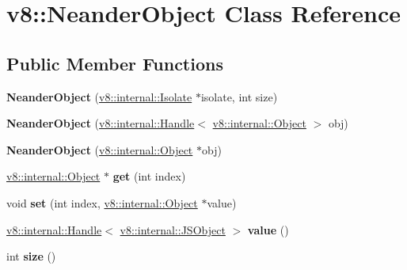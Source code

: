 \hypertarget{classv8_1_1_neander_object}{}\section{v8\+:\+:Neander\+Object Class Reference}
\label{classv8_1_1_neander_object}
\subsection*{Public Member Functions}
\begin{DoxyCompactItemize}
\item 
{\bfseries Neander\+Object} (\hyperlink{classv8_1_1internal_1_1_isolate}{v8\+::internal\+::\+Isolate} $\ast$isolate, int size)\hypertarget{classv8_1_1_neander_object_ab43be492a88b997dc95e2172069aaeeb}{}\label{classv8_1_1_neander_object_ab43be492a88b997dc95e2172069aaeeb}

\item 
{\bfseries Neander\+Object} (\hyperlink{classv8_1_1internal_1_1_handle}{v8\+::internal\+::\+Handle}$<$ \hyperlink{classv8_1_1internal_1_1_object}{v8\+::internal\+::\+Object} $>$ obj)\hypertarget{classv8_1_1_neander_object_afb3c7c82a9f93d281468ce7395d7274c}{}\label{classv8_1_1_neander_object_afb3c7c82a9f93d281468ce7395d7274c}

\item 
{\bfseries Neander\+Object} (\hyperlink{classv8_1_1internal_1_1_object}{v8\+::internal\+::\+Object} $\ast$obj)\hypertarget{classv8_1_1_neander_object_a93f0c214769d2c36648aa4d1c05394bb}{}\label{classv8_1_1_neander_object_a93f0c214769d2c36648aa4d1c05394bb}

\item 
\hyperlink{classv8_1_1internal_1_1_object}{v8\+::internal\+::\+Object} $\ast$ {\bfseries get} (int index)\hypertarget{classv8_1_1_neander_object_a53140b096e48598b3c6b57ead088fc2b}{}\label{classv8_1_1_neander_object_a53140b096e48598b3c6b57ead088fc2b}

\item 
void {\bfseries set} (int index, \hyperlink{classv8_1_1internal_1_1_object}{v8\+::internal\+::\+Object} $\ast$value)\hypertarget{classv8_1_1_neander_object_adc01a7a561fcd3becf63a02c8c639baa}{}\label{classv8_1_1_neander_object_adc01a7a561fcd3becf63a02c8c639baa}

\item 
\hyperlink{classv8_1_1internal_1_1_handle}{v8\+::internal\+::\+Handle}$<$ \hyperlink{classv8_1_1internal_1_1_j_s_object}{v8\+::internal\+::\+J\+S\+Object} $>$ {\bfseries value} ()\hypertarget{classv8_1_1_neander_object_a96e1658babe1cada4a086b2e32d11756}{}\label{classv8_1_1_neander_object_a96e1658babe1cada4a086b2e32d11756}

\item 
int {\bfseries size} ()\hypertarget{classv8_1_1_neander_object_acb078c5b91fd2f01b8bacf07a098786b}{}\label{classv8_1_1_neander_object_acb078c5b91fd2f01b8bacf07a098786b}

\end{DoxyCompactItemize}
